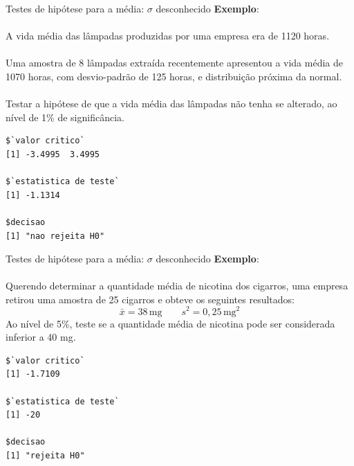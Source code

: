\documentclass[10pt]{beamer}\usepackage[]{graphicx}\usepackage[]{color}
\makeatletter
\newenvironment{kframe}{%
 \def\at@end@of@kframe{}%
 \ifinner\ifhmode%
  \def\at@end@of@kframe{\end{minipage}}%
  \begin{minipage}{\columnwidth}%
 \fi\fi%
 \def\FrameCommand##1{\hskip\@totalleftmargin \hskip-\fboxsep
 \colorbox{shadecolor}{##1}\hskip-\fboxsep
     \hskip-\linewidth \hskip-\@totalleftmargin \hskip\columnwidth}%
 \MakeFramed {\advance\hsize-\width
   \@totalleftmargin\z@ \linewidth\hsize
   \@setminipage}}%
 {\par\unskip\endMakeFramed%
 \at@end@of@kframe}
\newenvironment{knitrout}{}{} %
\theoremstyle{definition}
\makeatother
\begin{document}
\begin{frame}[fragile]{Testes de hipótese para a média: $\sigma$ desconhecido}
  \textbf{Exemplo}: \\~\\
  A vida média das lâmpadas produzidas por uma empresa era de
  1120 horas. \\~\\
  Uma amostra de 8 lâmpadas extraída recentemente apresentou
  a vida média de 1070 horas, com desvio-padrão de 125 horas, e
  distribuição próxima da normal. \\~\\
  Testar a hipótese de que a vida média
  das lâmpadas não tenha se alterado, ao nível de 1\% de significância.
  \pause
\begin{knitrout}\footnotesize
{}\color{fgcolor}\begin{kframe}
\begin{verbatim}
$`valor critico`
[1] -3.4995  3.4995

$`estatistica de teste`
[1] -1.1314

$decisao
[1] "nao rejeita H0"
\end{verbatim}
\end{kframe}
\end{knitrout}
\end{frame}

\begin{frame}[fragile]{Testes de hipótese para a média: $\sigma$ desconhecido}
  \textbf{Exemplo}: \\~\\
  Querendo determinar a quantidade média de nicotina dos
  cigarros, uma empresa retirou uma amostra de 25 cigarros e obteve os
  seguintes resultados:
  \begin{equation*}
    \bar{x} = 38 \, \text{mg} \qquad s^2 = 0,25 \, \text{mg}^2
  \end{equation*}
  Ao nível de 5\%, teste se a quantidade média de nicotina pode ser
  considerada inferior a 40 mg.
  \pause
\begin{knitrout}\footnotesize
{}\color{fgcolor}\begin{kframe}
\begin{verbatim}
$`valor critico`
[1] -1.7109

$`estatistica de teste`
[1] -20

$decisao
[1] "rejeita H0"
\end{verbatim}
\end{kframe}
\end{knitrout}
\end{frame}
\end{document}
